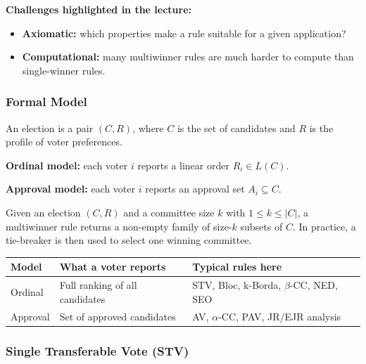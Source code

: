 \textbf{Challenges highlighted in the lecture:}
\begin{itemize}
  \item \textbf{Axiomatic:} which properties make a rule suitable for a given application?
  \item \textbf{Computational:} many multiwinner rules are much harder to compute than single-winner rules.
\end{itemize}

\separator

\subsubsection{Formal Model}

\begin{defbox}
An election is a pair $(C,R)$, where $C$ is the set of candidates and $R$ is the profile of voter preferences.
\end{defbox}

\begin{defbox}
\textbf{Ordinal model:} each voter $i$ reports a linear order $R_i \in L(C)$.

\textbf{Approval model:} each voter $i$ reports an approval set $A_i \subseteq C$.
\end{defbox}

\begin{defbox}
Given an election $(C,R)$ and a committee size $k$ with $1 \leq k \leq |C|$, a multiwinner rule returns a non-empty family of size-$k$ subsets of $C$. In practice, a tie-breaker is then used to select one winning committee.
\end{defbox}

\begin{center}
\renewcommand{\arraystretch}{1.25}
\begin{tabular}{@{}p{2.6cm}p{4.4cm}p{4.6cm}@{}}
\toprule
\textbf{Model} & \textbf{What a voter reports} & \textbf{Typical rules here} \\
\midrule
Ordinal & Full ranking of all candidates & STV, Bloc, k-Borda, $\beta$-CC, NED, SEO \\
Approval & Set of approved candidates & AV, $\alpha$-CC, PAV, JR/EJR analysis \\
\bottomrule
\end{tabular}
\end{center}

\separator

\subsubsection{Single Transferable Vote (STV)}

